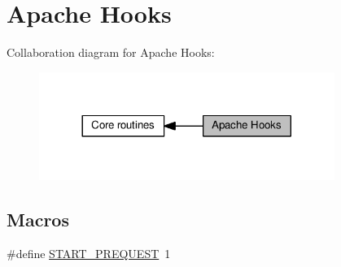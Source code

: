 \hypertarget{group__hooks}{}\section{Apache Hooks}
\label{group__hooks}
Collaboration diagram for Apache Hooks\+:
\nopagebreak
\begin{figure}[H]
\begin{center}
\leavevmode
\includegraphics[width=272pt]{group__hooks}
\end{center}
\end{figure}
\subsection*{Macros}
\begin{DoxyCompactItemize}
\item 
\#define \hyperlink{group__hooks_ga2f70b8d11ee2114ee670e7accfe88d72}{S\+T\+A\+R\+T\+\_\+\+P\+R\+E\+Q\+U\+E\+ST}~1
\end{DoxyCompactItemize}

